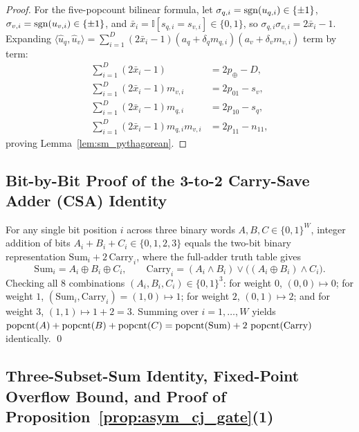 \begin{proof}
For the five-popcount bilinear formula, let $\sigma_{q,i} = \operatorname{sgn}(u_{q,i}) \in \{\pm 1\}$, $\sigma_{v,i} = \operatorname{sgn}(u_{v,i}) \in \{\pm 1\}$, and $\bar{x}_i = \mathbb{I}[s_{q,i} = s_{v,i}] \in \{0, 1\}$, so $\sigma_{q,i}\sigma_{v,i} = 2\bar{x}_i - 1$.
Expanding $\langle \hat{u}_q, \hat{u}_v\rangle = \sum_{i=1}^D (2\bar{x}_i - 1)(a_q + \delta_q m_{q,i})(a_v + \delta_v m_{v,i})$ term by term:
\begin{equation}
  \begin{aligned}
    \sum_{i=1}^D (2\bar{x}_i - 1) &= 2 p_\oplus - D, \\
    \sum_{i=1}^D (2\bar{x}_i - 1)m_{v,i} &= 2 p_{01} - s_v, \\
    \sum_{i=1}^D (2\bar{x}_i - 1)m_{q,i} &= 2 p_{10} - s_q, \\
    \sum_{i=1}^D (2\bar{x}_i - 1)m_{q,i}m_{v,i} &= 2 p_{11} - n_{11},
  \end{aligned}
\end{equation}
proving Lemma~\ref{lem:sm_pythagorean}.
\end{proof}

\subsection{Bit-by-Bit Proof of the 3-to-2 Carry-Save Adder ({CSA}) Identity}
For any single bit position $i$ across three binary words $A, B, C \in \{0, 1\}^W$, integer addition of bits $A_i + B_i + C_i \in \{0, 1, 2, 3\}$ equals the two-bit binary representation $\mathrm{Sum}_i + 2\,\mathrm{Carry}_i$, where the full-adder truth table gives
\begin{equation}
  \mathrm{Sum}_i = A_i \oplus B_i \oplus C_i, \qquad
  \mathrm{Carry}_i = (A_i \wedge B_i) \vee \bigl((A_i \oplus B_i) \wedge C_i\bigr).
\end{equation}
Checking all $8$ combinations $(A_i, B_i, C_i) \in \{0, 1\}^3$:
for weight $0$, $(0, 0) \mapsto 0$; for weight $1$, $(\mathrm{Sum}_i, \mathrm{Carry}_i) = (1, 0) \mapsto 1$; for weight $2$, $(0, 1) \mapsto 2$; and for weight $3$, $(1, 1) \mapsto 1 + 2 = 3$.
Summing over $i = 1, \dots, W$ yields $\operatorname{popcnt}(A) + \operatorname{popcnt}(B) + \operatorname{popcnt}(C) = \operatorname{popcnt}(\mathrm{Sum}) + 2\,\operatorname{popcnt}(\mathrm{Carry})$ identically. \qed

\subsection{Three-Subset-Sum Identity, Fixed-Point Overflow Bound, and Proof of Proposition~\ref{prop:asym_cj_gate}(1)}

